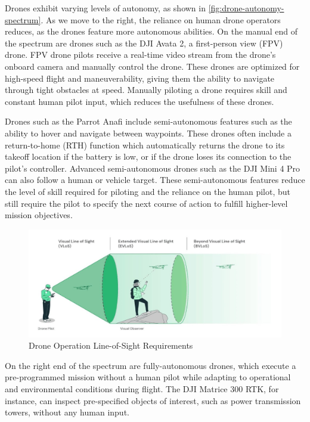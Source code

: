 Drones exhibit varying levels of autonomy, as shown in
\cref{fig:drone-autonomy-spectrum}. As we move to the right, the reliance on
human drone operators reduces, as the drones feature more autonomous abilities.
On the manual end of the spectrum are drones such as the DJI Avata 2, a
first-person view (FPV) drone. FPV drone pilots receive a real-time video
stream from the drone's onboard camera and manually control the drone. These
drones are optimized for high-speed flight and maneuverability, giving them the
ability to navigate through tight obstacles at speed. Manually piloting a drone
requires skill and constant human pilot input, which reduces the usefulness of
these drones.

Drones such as the Parrot Anafi include semi-autonomous features such as the
ability to hover and navigate between waypoints. These drones often include a
return-to-home (RTH) function which automatically returns the drone to its
takeoff location if the battery is low, or if the drone loses its connection to
the pilot's controller. Advanced semi-autonomous drones such as the DJI Mini 4
Pro can also follow a human or vehicle target. These semi-autonomous features
reduce the level of skill required for piloting and the reliance on the human
pilot, but still require the pilot to specify the next course of action to
fulfill higher-level mission objectives.

\begin{figure}[htbp]
    \centerline{\includegraphics[width = .9\textwidth]{figs/BVLOS.jpeg}}
    \caption{Drone Operation Line-of-Sight Requirements \cite{flyeye_bvlos}}
\label{fig:drone-line-of-sight}
\end{figure}

On the right end of the spectrum are fully-autonomous drones, which execute a
pre-programmed mission without a human pilot while adapting to operational and
environmental conditions during flight. The DJI Matrice 300 RTK, for instance,
can inspect pre-specified objects of interest, such as power transmission
towers, without any human input.

